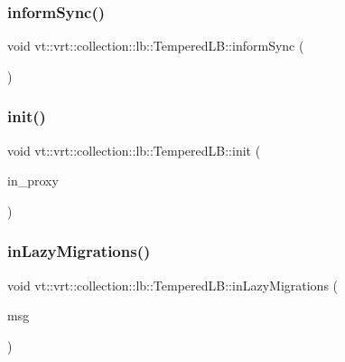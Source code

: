 \subsubsection{\texorpdfstring{inform\+Sync()}{informSync()}}
{\footnotesize\ttfamily void vt\+::vrt\+::collection\+::lb\+::\+Tempered\+L\+B\+::inform\+Sync (\begin{DoxyParamCaption}{ }\end{DoxyParamCaption})\hspace{0.3cm}{\ttfamily [protected]}}

\mbox{\label{structvt_1_1vrt_1_1collection_1_1lb_1_1_tempered_l_b_a57685d91f6518f5e479aba83f779d0f5}} 
\subsubsection{\texorpdfstring{init()}{init()}}
{\footnotesize\ttfamily void vt\+::vrt\+::collection\+::lb\+::\+Tempered\+L\+B\+::init (\begin{DoxyParamCaption}\item[{\hyperlink{structvt_1_1objgroup_1_1proxy_1_1_proxy}{objgroup\+::proxy\+::\+Proxy}$<$ \hyperlink{structvt_1_1vrt_1_1collection_1_1lb_1_1_tempered_l_b}{Tempered\+LB} $>$}]{in\+\_\+proxy }\end{DoxyParamCaption})}

\mbox{\label{structvt_1_1vrt_1_1collection_1_1lb_1_1_tempered_l_b_aa072b3bf3c82899d3228096b60de1647}} 
\subsubsection{\texorpdfstring{in\+Lazy\+Migrations()}{inLazyMigrations()}}
{\footnotesize\ttfamily void vt\+::vrt\+::collection\+::lb\+::\+Tempered\+L\+B\+::in\+Lazy\+Migrations (\begin{DoxyParamCaption}\item[{\hyperlink{structvt_1_1vrt_1_1collection_1_1balance_1_1_lazy_migration_msg}{balance\+::\+Lazy\+Migration\+Msg} $\ast$}]{msg }\end{DoxyParamCaption})\hspace{0.3cm}{\ttfamily [protected]}}

